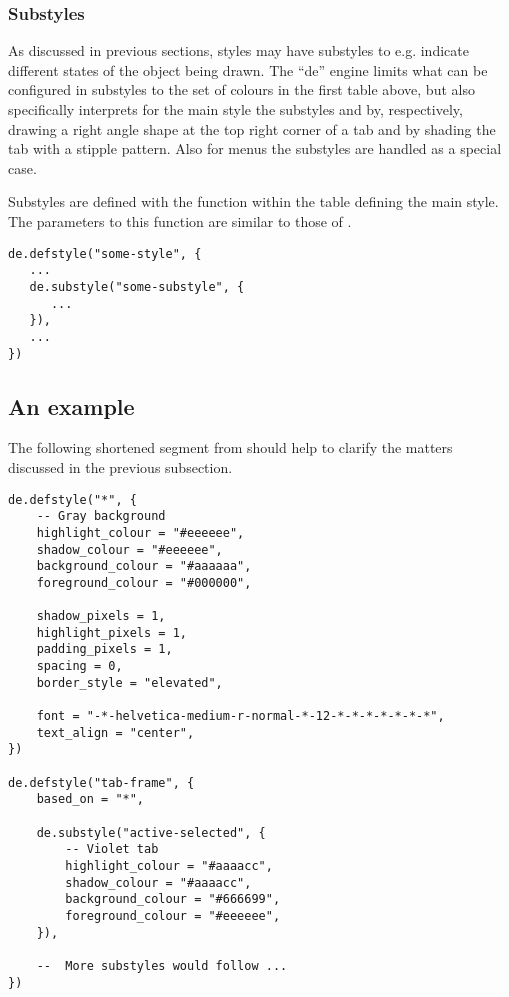 \subsubsection{Substyles}

As discussed in previous sections, styles may have substyles to e.g.
indicate different states of the object being drawn. The ``de'' engine
limits what can be configured in substyles to the set of colours in the
first table above, but also specifically interprets for the main style
 the substyles  and 
by, respectively, drawing a right angle shape at the top right corner 
of a tab and by shading the tab with a stipple pattern. Also for
menus the substyles  are handled as a special case.

Substyles are defined with the function  within the
table defining the main style. The parameters to this function are 
similar to those of .

\begin{verbatim}
de.defstyle("some-style", {
   ...
   de.substyle("some-substyle", {
      ...
   }),
   ...
})
\end{verbatim}


\subsection{An example}

The following shortened segment from 
should help to clarify the matters discussed in the previous
subsection.

\begin{verbatim}
de.defstyle("*", {
    -- Gray background
    highlight_colour = "#eeeeee",
    shadow_colour = "#eeeeee",
    background_colour = "#aaaaaa",
    foreground_colour = "#000000",
    
    shadow_pixels = 1,
    highlight_pixels = 1,
    padding_pixels = 1,
    spacing = 0,
    border_style = "elevated",
    
    font = "-*-helvetica-medium-r-normal-*-12-*-*-*-*-*-*-*",
    text_align = "center",
})

de.defstyle("tab-frame", {
    based_on = "*",
    
    de.substyle("active-selected", {
        -- Violet tab
        highlight_colour = "#aaaacc",
        shadow_colour = "#aaaacc",
        background_colour = "#666699",
        foreground_colour = "#eeeeee",
    }),

    --  More substyles would follow ...
})
\end{verbatim}


